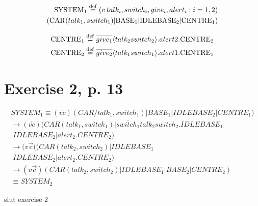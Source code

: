 \begin{equation}
\begin{split}
{\rm SYSTEM_1} \stackrel{\mathrm{def}}{=} (v\,talk_i , switch_i , give_i , alert_i : i = 1,2) \\
({\rm CAR}(talk_1 , switch_1) | {\rm BASE_1} | {\rm IDLEBASE_2} | {\rm CENTRE_1})
\end{split}
\end{equation}

\begin{equation}
\begin{split}
{\rm CENTRE_1} \stackrel{\mathrm{def}}{=} \overline{give_1} \langle talk_2 switch_2 \rangle .alert2.{\rm CENTRE_2} \\ 
{\rm CENTRE_2} \stackrel{\mathrm{def}}{=} \overline{give_2} \langle talk_1 switch_1 \rangle .alert1.{\rm CENTRE_1}
\end{split}
\end{equation}

\section{Exercise 2, p. 13}

\begin{equation}
\begin{split}
SYSTEM_1 \equiv  (v\overleftarrow{c})(CAR/talk_1,switch_1) | BASE_1 | IDLEBASE_2 | CENTRE_1) \\
\rightarrow (v\overleftarrow{c})(CAR(talk_1, switch_1) | \overline{switch_1}talk_2switch_2.IDLEBASE_1 \\
| IDLEBASE_2 | alert_2.CENTRE_2) \\
\rightarrow (v\overrightarrow{c}((CAR(talk_2,switch_2) | IDLEBASE_1 \\
| IDLEBASE_2 | alert_2.CENTRE_2) \\
\rightarrow (v\overrightarrow{c})(CAR(talk_2,switch_2) | IDLEBASE_1 | BASE_2 | CENTRE_2) \\
\equiv SYSTEM_2
\end{split}
\end{equation}

slut exercise 2